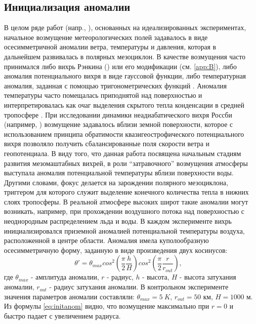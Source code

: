 \documentclass[12pt,a4paper]{report}
\begin{document}
\subsection{Инициализация аномалии}
\label{sec:initanom}
В целом ряде работ (напр., \citep{Adakudlu2012}), основанных на идеализированных экспериментах, начальное возмущение метеорологических полей задавалось в виде осесимметричной аномалии ветра, температуры и давления, которая в дальнейшем развивалась в полярных мезоциклон. В качестве возмущения часто принимался либо вихрь Рэнкина (\citep{EmanuelRotunno1989,YanaseNiino2007}) или его модификации (см. \ref{app:B}), либо аномалия потенциального вихря в виде гауссовой функции, либо температурная аномалия, заданная с помощью тригонометрических функций \citep{EggerHoinka2010}. Аномалия температуры часто помещалась приподнятой над поверхностью и интерпретировалась как очаг выделения скрытого тепла конденсации в средней тропосфере \citep{RT2003}. При исследовании динамики неадиабатического вихря Россби (например, \citep{MooreMontgomery2005}) возмущение задавалось вблизи земной поверхности, которое с использованием принципа обратимости квазигеострофического потенциального вихря  позволяло получить сбалансированные поля скорости ветра и геопотенциала.
В виду того, что данная работа посвящена начальным стадиям развития мезомаштабных вихрей, в роли “затравочного” возмущения атмосферы выступала аномалия потенциальной температуры вблизи поверхности воды. Другими словами, фокус делается на зарождении полярного мезоциклона, триггером для которого служит выделение конечного количества тепла в нижних слоях тропосферы. В реальной атмосфере высоких широт такие аномалии могут возникать, например, при прохождении воздушного потока над поверхностью с неоднородным распределением льда и воды.
В каждом эксперименте вихрь инициализировался приземной аномалией потенциальной температуры воздуха, расположенной в центре области. Аномалия имела куполообразную осесимметричную форму, заданную в виде произведения двух косинусов:
\begin{equation}\label{eq:initanom}
\theta'=\theta_{max}cos^2\left(\frac{\pi}{2}\frac{h}{H}\right) cos^2\left(\frac{\pi}{2}\frac{r}{r_{out}}\right),
\end{equation}
где $\theta_{max}$ - амплитуда аномалии, $r$ - радиус, $h$ - высота, $H$ - высота затухания аномалии, $r_{out}$ - радиус затухания аномалии.
В контрольном эксперименте значения параметров аномалии составляли: $\theta_{max}=5~K$, $r_{out}=50$ км, $H=1000$ м. Из формулы \ref{eq:initanom} видно, что возмущение максимально при $r=0$ и быстро падает с увеличением радиуса.
\end{document}
